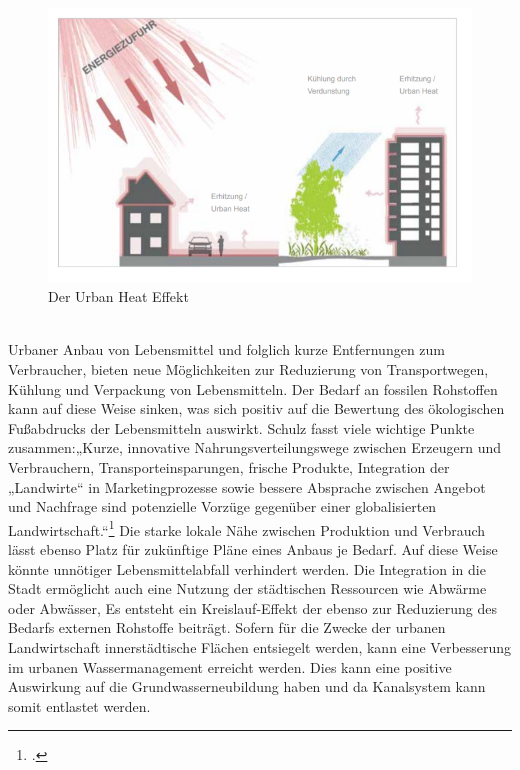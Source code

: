\documentclass{scrartcl}
\begin{document}
\begin{figure}[htbp]
\centering
\includegraphics[width=14cm]{image_folder/urbanheat.png}
\caption{Der Urban Heat Effekt}
\label{fig:urbanheateffekt}
\end{figure}
\\

Urbaner Anbau von Lebensmittel und folglich kurze Entfernungen zum Verbraucher, bieten neue Möglichkeiten zur Reduzierung von Transportwegen, Kühlung und Verpackung von Lebensmitteln. Der Bedarf an fossilen Rohstoffen kann auf diese Weise sinken, was sich positiv auf die Bewertung des ökologischen Fußabdrucks der Lebensmitteln auswirkt. Schulz fasst viele wichtige Punkte zusammen:„Kurze, innovative Nahrungsverteilungswege zwischen Erzeugern und Verbrauchern, Transporteinsparungen, frische Produkte, Integration der „Landwirte“ in Marketingprozesse sowie bessere Absprache zwischen Angebot und Nachfrage sind potenzielle Vorzüge gegenüber einer globalisierten Landwirtschaft.“\footcite[S.10]{Schulz2013UrbaneLandmanagements} Die starke lokale Nähe zwischen Produktion und Verbrauch lässt ebenso Platz für zukünftige Pläne eines Anbaus je Bedarf. Auf diese Weise könnte unnötiger Lebensmittelabfall verhindert werden. Die Integration in die Stadt ermöglicht auch eine Nutzung der städtischen Ressourcen wie Abwärme oder Abwässer, Es entsteht ein Kreislauf-Effekt der ebenso zur Reduzierung des Bedarfs externen Rohstoffe beiträgt.
Sofern für die Zwecke der urbanen Landwirtschaft innerstädtische Flächen entsiegelt werden, kann eine Verbesserung im urbanen Wassermanagement erreicht werden. Dies kann eine positive Auswirkung auf die Grundwasserneubildung haben und da Kanalsystem kann somit entlastet werden.  
  
\end{document}
